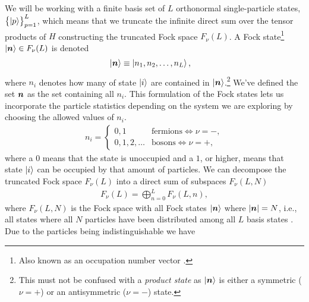             We will be working with a finite basis set of $L$ orthonormal
            single-particle states, $\left\{ \ket{p} \right\}_{p = 1}^{L}$, which means
            that we truncate the infinite direct sum over the tensor products of
            $H$ constructing the truncated Fock space $F_{\nu}(L)$.
            A Fock state\footnote{%
                Also known as an occupation number vector
                \cite{helgaker-molecular}.
            } $\ket{\boldsymbol{n}} \in F_{\nu}(L)$ is denoted
            \begin{align}
                \ket{\boldsymbol{n}}
                &\equiv \ket{n_1, n_2, \dots, n_L},
            \end{align}
            where $n_i$ denotes how many of state $\ket{i}$ are contained in
            $\ket{\boldsymbol{n}}$.\footnote{%
                This must not be confused with a \emph{product state} as
                $\ket{\boldsymbol{n}}$ is either a symmetric ($\nu = +$) or an
                antisymmetric ($\nu = -$) state.%
            }
            We've defined the set $\boldsymbol{n}$ as the set containing all $n_i$.
            This formulation of the Fock states lets us incorporate the particle
            statistics depending on the system we are exploring by choosing the
            allowed values of $n_i$.
            \begin{align}
                n_i =
                \begin{cases}
                    0, 1 & \text{fermions} \iff \nu = -, \\
                    0, 1, 2, \dots & \text{bosons} \iff \nu = +,
                \end{cases}
            \end{align}
            where a $0$ means that the state is unoccupied and a $1$, or higher,
            means that state $\ket{i}$ can be occupied by that amount of
            particles.
            We can decompose the truncated Fock space $F_{\nu}(L)$ into a direct
            sum of subspaces $F_{\nu}(L, N)$
            \begin{align}
                F_{\nu}(L)
                = \bigoplus_{n = 0}^{L}
                F_{\nu}(L, n),
            \end{align}
            where $F_{\nu}(L, N)$ is the Fock space with all Fock states
            $\ket{\boldsymbol{n}}$ where $\abs{\boldsymbol{n}} = N$, i.e., all states where
            all $N$ particles have been distributed among all $L$ basis states
            \cite{helgaker-molecular}.
            Due to the particles being indistinguishable we have
